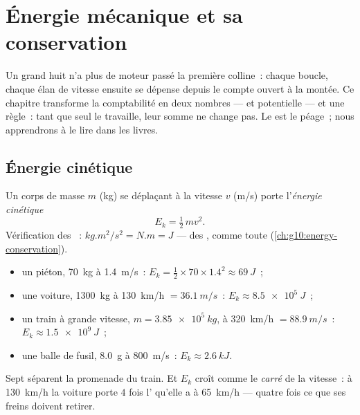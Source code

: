 \chapter{Énergie mécanique et sa conservation}\label{ch:g11:mechanical-energy}

Un grand huit n'a plus de moteur passé la première colline~: chaque
boucle, chaque élan de vitesse ensuite se dépense depuis le compte
ouvert à la montée. Ce chapitre transforme la comptabilité en deux
nombres ---  et
potentielle --- et une règle~: tant que seul le
travaille, leur somme ne change pas. Le
 est le péage~; nous apprendrons
à le lire dans les livres.

\section{Énergie cinétique}

\begin{definition}\label{def:g11:mechanical-energy:kinetic}
Un corps de masse $m$ (\unit{kg}) se déplaçant à la vitesse $v$
(\unit{m/s}) porte l'\emph{énergie cinétique}
\[
E_k = \tfrac12\, m v^2 .
\]
Vérification des ~:
$\unit{kg.m^2/s^2} = \unit{N.m} = \unit{J}$ --- des
, comme toute
(\cref{ch:g10:energy-conservation}).
\end{definition}

\begin{example}\label{ex:g11:mechanical-energy:orders}
\begin{itemize}
  \item un piéton, \qty{70}{kg} à \qty{1.4}{m/s}~:
        $E_k = \tfrac12 \times 70 \times 1.4^2 \approx \qty{69}{J}$~;
  \item une voiture, \qty{1300}{kg} à \qty{130}{km/h} $= \qty{36.1}{m/s}$~:
        $E_k \approx \qty{8.5e5}{J}$~;
  \item un train à grande vitesse, $m = \qty{3.85e5}{kg}$, à
        \qty{320}{km/h} $= \qty{88.9}{m/s}$~: $E_k \approx \qty{1.5e9}{J}$~;
  \item une balle de fusil, \qty{8.0}{g} à \qty{800}{m/s}~:
        $E_k \approx \qty{2.6}{kJ}$.
\end{itemize}
Sept  séparent la promenade du train. Et $E_k$ croît
comme le \emph{carré} de la vitesse~: à \qty{130}{km/h} la voiture porte
$4$ fois l' qu'elle a à
\qty{65}{km/h} --- quatre fois ce que ses freins doivent retirer.
\end{example}


